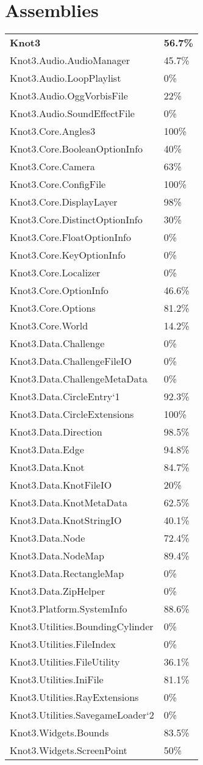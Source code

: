 \documentclass[a4paper,10pt]{article}
\begin{document}
\section{Assemblies}
\begin{longtable}[l]{ll}
\textbf{Knot3} & \textbf{56.7\%}\\
Knot3.Audio.AudioManager & 45.7\%\\
Knot3.Audio.LoopPlaylist & 0\%\\
Knot3.Audio.OggVorbisFile & 22\%\\
Knot3.Audio.SoundEffectFile & 0\%\\
Knot3.Core.Angles3 & 100\%\\
Knot3.Core.BooleanOptionInfo & 40\%\\
Knot3.Core.Camera & 63\%\\
Knot3.Core.ConfigFile & 100\%\\
Knot3.Core.DisplayLayer & 98\%\\
Knot3.Core.DistinctOptionInfo & 30\%\\
Knot3.Core.FloatOptionInfo & 0\%\\
Knot3.Core.KeyOptionInfo & 0\%\\
Knot3.Core.Localizer & 0\%\\
Knot3.Core.OptionInfo & 46.6\%\\
Knot3.Core.Options & 81.2\%\\
Knot3.Core.World & 14.2\%\\
Knot3.Data.Challenge & 0\%\\
Knot3.Data.ChallengeFileIO & 0\%\\
Knot3.Data.ChallengeMetaData & 0\%\\
Knot3.Data.CircleEntry`1 & 92.3\%\\
Knot3.Data.CircleExtensions & 100\%\\
Knot3.Data.Direction & 98.5\%\\
Knot3.Data.Edge & 94.8\%\\
Knot3.Data.Knot & 84.7\%\\
Knot3.Data.KnotFileIO & 20\%\\
Knot3.Data.KnotMetaData & 62.5\%\\
Knot3.Data.KnotStringIO & 40.1\%\\
Knot3.Data.Node & 72.4\%\\
Knot3.Data.NodeMap & 89.4\%\\
Knot3.Data.RectangleMap & 0\%\\
Knot3.Data.ZipHelper & 0\%\\
Knot3.Platform.SystemInfo & 88.6\%\\
Knot3.Utilities.BoundingCylinder & 0\%\\
Knot3.Utilities.FileIndex & 0\%\\
Knot3.Utilities.FileUtility & 36.1\%\\
Knot3.Utilities.IniFile & 81.1\%\\
Knot3.Utilities.RayExtensions & 0\%\\
Knot3.Utilities.SavegameLoader`2 & 0\%\\
Knot3.Widgets.Bounds & 83.5\%\\
Knot3.Widgets.ScreenPoint & 50\%\\
\end{longtable}
\newpage
\end{document}
